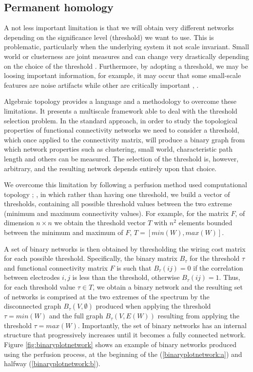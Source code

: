 \documentclass[11pt, onecolumn]{article}
\begin{document}
\subsection{Permanent homology}
A not less important limitation is that we will obtain very different networks depending on the significance level (threshold) we want to use. This is problematic, particularly when the underlying system it not scale invariant. Small world or clusterness are joint measures and can change very drastically depending on the choice of the threshold \cite{toppi2012statistica}. Furthermore, by adopting a threshold, we may be loosing important information, for example, it may occur that some small-scale features are noise artifacts while other are critically important \cite{fallani2014graph}, \cite{papo2014complex}.

Algebraic topology \cite{munkres1984elements} provides a language and a methodology to overcome these limitations. It presents a multiscale framework able to deal with the threshold selection problem.
In the standard approach, in order to study the  topological properties of functional connectivity networks we need to consider a threshold, which once applied to the connectivity matrix, will produce a binary graph from which network properties such as clustering, small world, characteristic path length and others can be measured. 
The selection of the threshold is, however, arbitrary, and the resulting network depends entirely upon that choice.

We overcome this limitation by following a perfusion method used computational topology \citep{dabaghian2014reconceiving}; \citep{dotko2016topological}, in which rather than having one threshold, we build a vector of thresholds, containing all possible threshold values between the two extreme (minimum and maximum connectivity values). For example, for the matrix $F$, of dimension $n \times n$ we obtain the threshold vector $T$ with $n^2$ elements bounded between the minimum and maximum of $F$, $T = [min(W), max(W)]$.

A set of binary networks is then obtained by thresholding the wiring cost matrix for each possible threshold. Specifically, the binary matrix $B_{\tau}$ for the threshold $\tau$ and functional connectivity matrix $F$ is such that $B_{\tau}(ij) =0$ if the correlation between electrodes $i,j$ is less than the threshold, otherwise $B_{\tau}(ij)=1$. 
Thus, for each threshold value $\tau \in T$, we obtain a binary network and the resulting set of networks is comprised at the two extremes of the spectrum by the disconnected graph $B_{\tau}(V,\emptyset)$ produced when applying the threshold $\tau = min(W)$ and the full graph $B_{\tau}(V,E(W))$ resulting from applying the threshold $\tau = max(W)$. 
Importantly, the set of binary networks has an internal structure that progressively increases until it becomes a fully connected network. 
Figure \ref{fig:binaryplotnetwork} shows an example of binary networks produced using the perfusion process, at the beginning of the  (\ref{binaryplotnetwork:a}) and halfway (\ref{binaryplotnetwork:b}). 
\end{document}
